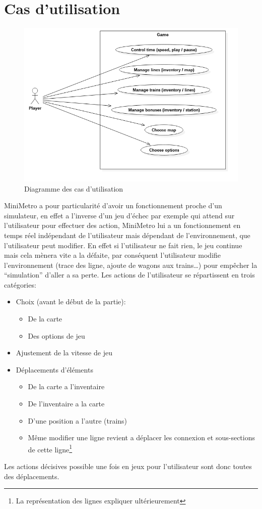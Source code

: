 \documentclass[report, backcover, french, nodocumentinfo]{upmethodology-document}
\begin{document}
		\section{Cas d'utilisation}\label{useCases}
			\begin{figure}[h!]
				\centering
				\includegraphics[width=\textwidth]{figures/UseCaseDiagram}
				\caption{Diagramme des cas d'utilisation}
				\label{fig:UseCaseDiagram}
			\end{figure}
				MiniMetro a pour particularité d'avoir un fonctionnement proche d'un simulateur, en effet a l'inverse d'un jeu d'échec par exemple qui attend sur l'utilisateur pour effectuer des action, MiniMetro lui a un fonctionnement en temps réel indépendant de l'utilisateur mais dépendant de l’environnement, que l'utilisateur peut modifier. En effet si l'utilisateur ne fait rien, le jeu continue mais cela mènera vite a la défaite, par conséquent l'utilisateur modifie l’environnement (trace des ligne, ajoute de wagons aux trains\ldots) pour empêcher la ``simulation'' d'aller a sa perte.
				Les actions de l'utilisateur se répartissent en trois catégories:
				\begin{itemize}
					\item Choix (avant le début de la partie):
						\begin{itemize}
							\item De la carte
							\item Des options de jeu
						\end{itemize}
					\item Ajustement de la vitesse de jeu
					\item Déplacements d'éléments
						\begin{itemize}
							\item De la carte a l'inventaire
							\item De l'inventaire a la carte
							\item D'une position a l'autre (trains)
							\item Même modifier une ligne revient a déplacer les connexion et sous-sections de cette ligne\footnote{La représentation des lignes expliquer ultérieurement}
						\end{itemize}
				\end{itemize}
				Les actions décisives possible une fois en jeux pour l'utilisateur sont donc toutes des déplacements.
\end{document}
